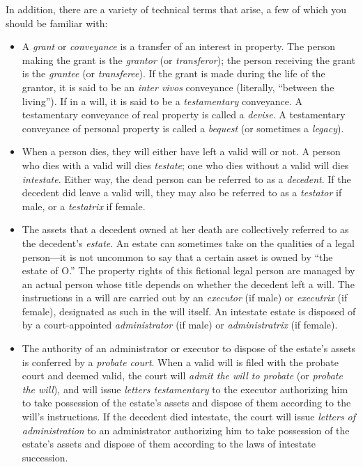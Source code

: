 In addition, there are a variety of technical terms that arise, a few of which
you should be familiar with:
\begin{itemize}
\item A \textit{grant} or \textit{conveyance} is a transfer of an interest in
property. The person making the grant is the \textit{grantor} (or
\textit{transferor}); the person receiving the grant is the \textit{grantee} (or
\textit{transferee}). If the grant is made during the life of the grantor,
it is said to be an \textit{inter vivos} conveyance (literally, ``between the
living''). If in a will, it is said to be a \textit{testamentary} conveyance. A
testamentary conveyance of real property is called a \textit{devise}. A
testamentary conveyance of personal property is called a \textit{bequest} (or
sometimes a \textit{legacy}).

\item When a person dies, they will either have left a valid will or not. A
person who dies with a valid will dies \textit{testate}; one who dies without a
valid will dies \textit{intestate}. Either way, the dead person can be
referred to as a \textit{decedent}. If the decedent did leave a valid will,
they may also be referred to as a \textit{testator} if male, or a
\textit{testatrix} if female. 

\item The assets that a decedent owned at her death are collectively referred to
as the decedent's \textit{estate}. An estate can sometimes take on the
qualities of a legal person---it is not uncommon to say that a certain asset is
owned by ``the estate of O.'' The property rights of this fictional legal
person are managed by an actual person whose title depends on whether the
decedent left a will. The instructions in a will are carried out by an
\textit{executor} (if male) or \textit{executrix} (if female), designated as
such in the will itself. An intestate estate is disposed of by a
court-appointed \textit{administrator} (if male) or \textit{administratrix} (if
female). 
\item The authority of an administrator or executor to dispose of the estate's
assets is conferred by a \textit{probate court}. When a valid will is filed
with the probate court and deemed valid, the court will \textit{admit the will
to probate} (or \textit{probate the will}), and will issue \textit{letters
testamentary} to the executor authorizing him to take possession of the
estate's assets and dispose of them according to the will's instructions. If
the decedent died intestate, the court will issue \textit{letters of
administration} to an administrator authorizing him to take possession of the
estate's assets and dispose of them according to the laws of intestate
succession.


\end{itemize}

